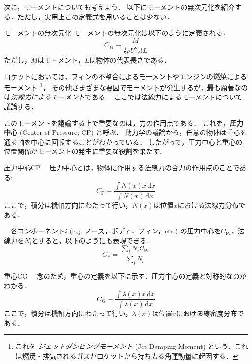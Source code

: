 \documentclass[uplatex,dvipdfmx,a4j,11pt]{jsreport}
\newcommand{\keyword}[1]{\textcolor{mainblue}{\textbf{#1}}}
\newcommand{\diff}{\mathrm{d}} %
\numberwithin{equation}{chapter}
\begin{document}
\enskip

次に，モーメントについても考えよう．
以下にモーメントの無次元化を紹介する．ただし，実用上この定義式を用いることは少ない．
\begin{definition}{モーメントの無次元化}{}{}
  モーメントの無次元化は以下のように定義される．
    \begin{equation}
      C_M \equiv \frac{M}{\frac{1}{2}\rho U^{2}A L}
    \end{equation}
  ただし，$M$はモーメント，$L$は物体の代表長さである．
\end{definition}

ロケットにおいては，フィンの不整合によるモーメントやエンジンの燃焼によるモーメント
\footnote{これを \emph{ジェットダンピングモーメント} (Jet Damping Moment) という．これは燃焼・排気されるガスがロケットから持ち去る角運動量に起因する．}，
その他さまざまな要因でモーメントが発生するが，最も顕著なのは\emph{法線力によるモーメント}である．
ここでは法線力によるモーメントについて議論する．

このモーメントを議論する上で重要なのは，力の作用点である．
これを，\keyword{圧力中心} (Center of Pressure; CP) と呼ぶ．
動力学の議論から，任意の物体は重心を通る軸を中心に回転することがわかっている．
したがって，圧力中心と重心の位置関係がモーメントの発生に重要な役割を果たす．
\begin{definition}{圧力中心}{CP}{}
  　圧力中心とは，物体に作用する法線力の合力の作用点のことである:
    \begin{equation}
      C_\mathrm{P} \equiv \frac{\int N(x)x\,\diff x}{\int N(x)\,\diff x}
    \end{equation}
  ここで，積分は機軸方向にわたって行い，$N(x)$は位置$x$における法線力分布である．

  　各コンポーネント$i$ (e.g. ノーズ，ボディ，フィン，etc.) の圧力中心を$C_{\mathrm{P}i}$，法線力を$N_i$とすると，以下のようにも表現できる.
  \begin{equation}
    C_\mathrm{P} = \frac{\sum_i N_i C_{\mathrm{P}i}}{\sum_i N_i}
  \end{equation}
\end{definition}

\begin{remark}{重心}{CG}{}
  　念のため，重心の定義を以下に示す．圧力中心の定義と対称的なのがわかる．
    \begin{equation}
      C_\mathrm{G} \equiv \frac{\int \lambda(x)x\,\diff x}{\int \lambda(x)\,\diff x}
    \end{equation}
  ここで，積分は機軸方向にわたって行い，$\lambda(x)$は位置$x$における線密度分布である．
\end{remark}
\end{document}

